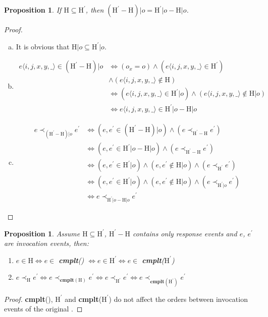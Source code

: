 \documentclass[a4paper,USenglish]{lipics-v2016}
\newtheorem{prop}[theorem]{Proposition}
\newcommand{\cmplt}{\textbf{cmplt}}
\newcommand{\his}{\text{H}}
\newcommand{\myvert}{\vert}
\begin{document}
\begin{prop}\label{lem_diffhis_oeq}
	If $\his \subseteq \his^\prime$, then $(\his^\prime - \his) \myvert o = \his^\prime \myvert o - \his \myvert o$.
\end{prop}
\begin{proof}
	\begin{enumerate}[(a)]
		\item
		It is obvious that $\his \myvert o \subseteq \his^\prime \myvert o$.
		
		\item
		\begin{align*}
		e \langle i, j, x, y, \_ \rangle \in (\his^\prime - \his) \myvert o &\iff (o_x = o) \land (e \langle i, j, x, y, \_ \rangle \in \his^\prime)\\
		&\land (e \langle i, j, x, y, \_ \rangle \notin \his) \\
		&\iff (e \langle i, j, x, y, \_ \rangle \in \his^\prime \myvert o) \land (e \langle i, j, x, y, \_ \rangle \notin \his \myvert o) \\
		&\iff e \langle i, j, x, y, \_ \rangle \in \his^\prime \myvert o - \his \myvert o
		\end{align*}
		
		\item
		\begin{align*}
		e \prec_{(\his^\prime - \his) \myvert o} e^\prime &\iff (e, e^\prime \in {(\his^\prime - \his) \myvert o}) \land (e \prec_{\his^\prime - \his} e^\prime)\\
		&\iff (e, e^\prime \in \his^\prime \myvert o - \his \myvert o ) \land (e \prec_{\his^\prime - \his} e^\prime)\\
		&\iff (e, e^\prime \in \his^\prime \myvert o) \land (e, e^\prime \notin \his \myvert o) \land (e \prec_{\his^\prime} e^\prime) \\
		&\iff (e, e^\prime \in \his^\prime \myvert o) \land (e, e^\prime \notin \his \myvert o) \land (e \prec_{\his^\prime \myvert o} e^\prime) \\
		&\iff e \prec_{\his^\prime \myvert o - \his \myvert o} e^\prime
		\end{align*}	
	\end{enumerate}
\end{proof}

\begin{prop}\label{lem_inv}
	Assume $\his \subseteq \his^\prime$, $\his^\prime - \his$ contains only response events and $e$, $e^\prime$ are invocation events, then:
	\begin{enumerate}[(1)]
		\item
		$e \in \his \iff e \in$ \cmplt({\his}) $\iff e \in \his^\prime \iff e \in$ \cmplt($\his^\prime$)
		\item
		$e \prec_{\his} e^\prime \iff e \prec_{\cmplt(\his)} e^\prime \iff e \prec_{\his^\prime} e^\prime \iff e \prec_{\cmplt(\his^\prime)} e^\prime$
	\end{enumerate}
\end{prop}
\begin{proof}
	\cmplt({\his}), $\his^\prime$ and \cmplt($\his^\prime$) do not affect the orders between invocation events of the original {\his}.
\end{proof}
\end{document}

